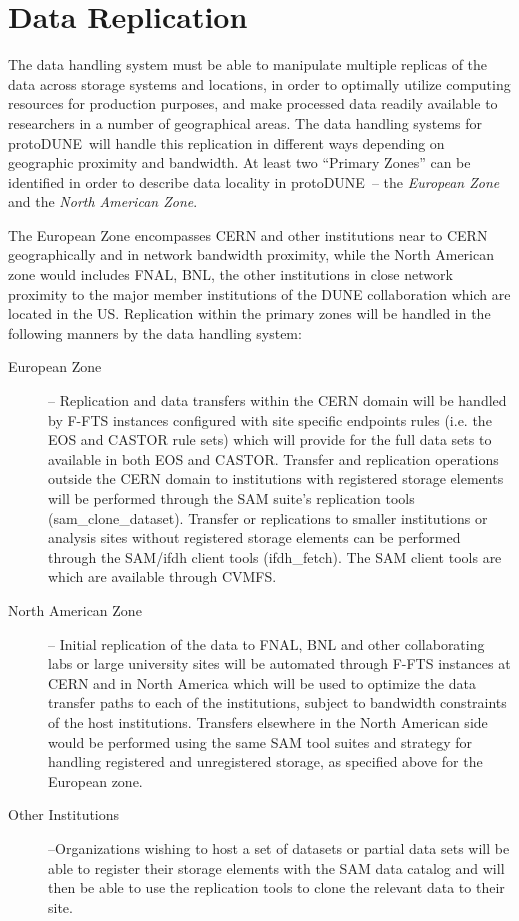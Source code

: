 \documentclass[pdftex,12pt,letter]{article}
\newcommand{\pd}{protoDUNE\ }
\begin{document}
\section{Data Replication}

The data handling system must be able to manipulate multiple replicas of the data across storage systems and locations, in order
to optimally utilize computing resources for production purposes, and make processed data readily available to researchers in
a number of geographical areas.
The data handling systems for \pd will handle this replication in different ways
depending on geographic proximity and bandwidth.  At least two ``Primary Zones'' can be identified in order
to describe data locality in \pd -- the \textit{European Zone} and the \textit{North American Zone}.

The European Zone encompasses CERN and other institutions near to CERN geographically and in network bandwidth proximity,
while the North American zone would includes  FNAL, BNL, the other institutions
in close network proximity to the major member institutions of the DUNE collaboration which are located in the US.
Replication within the primary zones will be handled in the following manners by the data handling system:

\begin{description}
\item[European Zone] -- Replication and data transfers within the CERN domain will be handled by F-FTS instances configured with site specific endpoints rules (i.e. the EOS and CASTOR rule sets) which will provide for the full data sets to available in both EOS and CASTOR.  Transfer and replication operations outside the CERN domain to institutions with registered storage elements will be performed through the SAM suite’s replication tools (sam\_clone\_dataset).  Transfer or replications to smaller institutions or analysis sites without registered storage elements can be performed through the SAM/ifdh client tools (ifdh\_fetch).  The SAM client tools are which are available through CVMFS.  

\item[North American Zone] -- Initial replication of the data to FNAL, BNL and other collaborating labs or large university sites will be
automated through F-FTS instances at CERN and in North America which will be used to optimize the data transfer paths to each of
the institutions, subject to bandwidth constraints of the host institutions.   Transfers elsewhere in the North American side would be
performed using the same SAM tool suites and strategy for handling registered and unregistered storage, as specified above for the European zone. 

\item[Other Institutions] --Organizations wishing to host a set of datasets or partial data sets will be able to register their storage
elements with the SAM data catalog and will then be able to use the replication tools to clone the relevant data to their site. 
\end{description}
\end{document}
